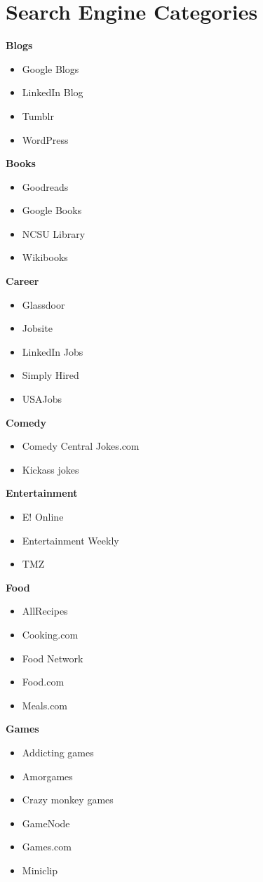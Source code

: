 \section{Search Engine Categories}

\textbf{Blogs}
\begin{itemize}
\item	Google Blogs	
\item	LinkedIn Blog	
\item	Tumblr	
\item	WordPress	
\end{itemize}
\textbf{Books}
\begin{itemize}
\item	Goodreads	
\item	Google Books	
\item	NCSU Library 	
\item	Wikibooks	
\end{itemize}
\textbf{Career}
\begin{itemize}
\item	Glassdoor	
\item	Jobsite	
\item	LinkedIn Jobs	
\item	Simply Hired	
\item	USAJobs	
\end{itemize}
\textbf{Comedy}
\begin{itemize}
\item	Comedy Central Jokes.com	
\item	Kickass jokes	
\end{itemize}
\textbf{Entertainment}
\begin{itemize}
\item	E! Online	
\item	Entertainment Weekly	
\item	TMZ	
\end{itemize}
\textbf{Food}
\begin{itemize}
\item	AllRecipes	
\item	Cooking.com	
\item	Food Network	
\item	Food.com	
\item	Meals.com	
\end{itemize}
\textbf{Games}
\begin{itemize}
\item	Addicting games	
\item	Amorgames	
\item	Crazy monkey games	
\item	GameNode	
\item	Games.com	
\item	Miniclip	
\end{itemize}
